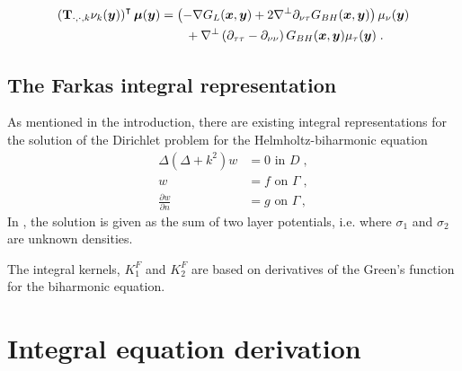 \documentclass[preprint,12pt]{article}
\def\xx{{\boldsymbol x}}
\def\yy{{\boldsymbol y}}
\def\TT{{\bf T}}
\def\bmu{{\boldsymbol \mu}}
\begin{document}
\begin{align}
  \left ( \TT_{\cdot,\cdot,k}\nu_k(\yy) \right )^\intercal
  \bmu(\yy) &= \left ( - \nabla G_L(\xx,\yy) + 2 \nabla^\bot
  \partial_{\nu\tau} G_{BH}(\xx,\yy) \right ) \mu_\nu(\yy) \nonumber \\
  & \qquad+
  \nabla^\bot \left (\partial_{\tau\tau}-\partial_{\nu\nu} \right )
  G_{BH}(\xx,\yy) \mu_\tau(\yy) \; .
\end{align}


\subsection{The Farkas integral representation} 

As mentioned in the introduction, there are existing 
integral representations for the solution of the Dirichlet problem for the Helmholtz-biharmonic equation
\begin{align}
 \Delta (\Delta + k^2) w &= 0 \mbox{ in } D \; , \label{eq:biharmD1}\\
 w &= f \mbox{ on }
 \Gamma \label{eq:biharmD2} \; , \\ 
 \frac{\partial w}{\partial n} &= g \mbox{ on } 
 \Gamma \, , \label{eq:biharmD3}
\end{align}
In \cite{Farkas89}, 
the solution is given as the sum of two layer potentials, i.e.
where $\sigma_1$ and $\sigma_2$ are unknown densities.

The integral kernels, $K_1^F$ and $K_2^F$ are based on
derivatives of the Green's function for the biharmonic equation.

\section{Integral equation derivation} \label{sec:anapp}
\end{document}
